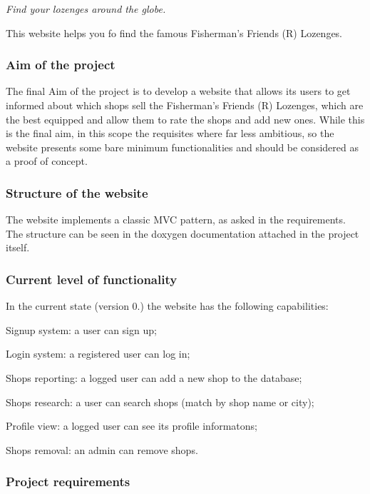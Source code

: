 {\itshape Find your lozenges around the globe.}

This website helps you fo find the famous Fisherman's Friends (R) Lozenges.

\subsubsection*{Aim of the project}

The final Aim of the project is to develop a website that allows its users to get informed about which shops sell the Fisherman's Friends (R) Lozenges, which are the best equipped and allow them to rate the shops and add new ones. While this is the final aim, in this scope the requisites where far less ambitious, so the website presents some bare minimum functionalities and should be considered as a proof of concept.

\subsubsection*{Structure of the website}

The website implements a classic M\+V\+C pattern, as asked in the requirements. The structure can be seen in the doxygen documentation attached in the project itself.

\subsubsection*{Current level of functionality}

In the current state (version 0.) the website has the following capabilities\+:


\begin{DoxyItemize}
\item Signup system\+: a user can sign up;
\item Login system\+: a registered user can log in;
\item Shops reporting\+: a logged user can add a new shop to the database;
\item Shops research\+: a user can search shops (match by shop name or city);
\item Profile view\+: a logged user can see its profile informatons;
\item Shops removal\+: an admin can remove shops.
\end{DoxyItemize}

\subsubsection*{Project requirements}

